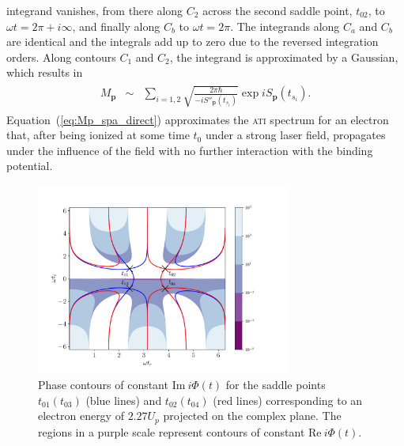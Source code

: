 integrand vanishes, from there along $C_{2}$ across the second saddle
point, $t_{02}$, to $\omega t = 2\pi + i\infty$, and finally along
$C_{b}$ to $\omega t = 2\pi$. The integrands along $C_{a}$ and $C_{b}$
are identical and the integrals add up to zero due to the reversed
integration orders. Along contours $C_{1}$ and $C_{2}$, the integrand
is approximated by a Gaussian, which results in~\cite{phd_Kopold}
\begin{eqnarray}
  \label{eq:Mp_spa_direct}
  \begin{split}
    M_{\mathbf{p}} & \sim & \sum\limits_{i = 1,2}
    \sqrt{\frac{2\pi\hbar}{-i S''_{\mathbf{p}}(t_{s_{i}})}}
    \exp iS_{\mathbf{p}}(t_{s_{i}}).
  \end{split}
\end{eqnarray}
%
Equation~(\ref{eq:Mp_spa_direct}) approximates the \textsc{ati}
spectrum for an electron that, after being ionized at some time
$t_{0}$ under a strong laser field, propagates under the influence of
the field with no further interaction with the binding potential.

\begin{figure}
  \centering
  \includegraphics[width = 0.75\textwidth]{figures/ch_ATI_SPA/direct/phase_contour12}
  \caption{Phase contours of constant $\mathrm{Im}\ i\Phi(t)$ for the
    saddle points $t_{01}(t_{03})$ (blue lines) and $t_{02}(t_{04})$
    (red lines) corresponding to an electron energy of $2.27 U_{p}$
    projected on the complex plane. The regions in a purple scale
    represent contours of constant $\mathrm{Re}\ i\Phi(t)$.}
  \label{fig:sp_contours}
\end{figure}

